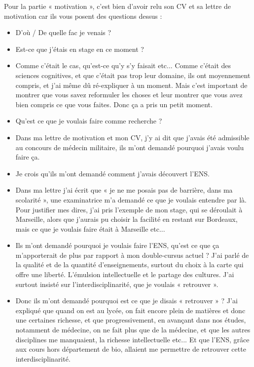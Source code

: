 Pour la partie « motivation », c’est bien d’avoir relu son CV et sa lettre de motivation car ils vous posent des questions dessus :

\begin{itemize}
    \item D’où / De quelle fac je venais ?
    \item Est-ce que j’étais en stage en ce moment ?
    \item Comme c’était le cas, qu’est-ce qu’y s'y faisait etc... Comme c’était des sciences cognitives, et que c’était pas trop leur domaine, ils ont moyennement compris, et j’ai même dû ré-expliquer à un moment. Mais c’est important de montrer que vous savez reformuler les choses et leur montrer que vous avez bien compris ce que vous faites. Donc ça a pris un petit moment.
    \item Qu’est ce que je voulais faire comme recherche ?
    \item Dans ma lettre de motivation et mon CV, j’y ai dit que j’avais été admissible au concours de médecin militaire, ils m’ont demandé pourquoi j’avais voulu faire ça.
    \item Je crois qu’ils m’ont demandé comment j’avais découvert l’ENS.
    \item Dans ma lettre j’ai écrit que « je ne me posais pas de barrière, dans ma scolarité », une examinatrice m’a demandé ce que je voulais entendre par là. Pour justifier mes dires, j’ai pris l’exemple de mon stage, qui se déroulait à Marseille, alors que j’aurais pu choisir la facilité en restant sur Bordeaux, mais ce que je voulais faire était à Marseille etc...
    \item Ils m’ont demandé pourquoi je voulais faire l’ENS, qu’est ce que ça m’apporterait de plus par rapport à mon double-cursus actuel ? J’ai parlé de la qualité et de la quantité d’enseignements, surtout du choix à la carte qui offre une liberté. L’émulsion intellectuelle et le partage des cultures. J’ai surtout insisté sur l’interdisciplinarité, que je voulais « retrouver ».
    \item Donc ils m’ont demandé pourquoi est ce que je disais « retrouver » ? J’ai expliqué que quand on est au lycée, on fait encore plein de matières et donc une certaines richesse, et que progressivement, en avançant dans nos études, notamment de médecine, on ne fait plus que de la médecine, et que les autres disciplines me manquaient, la richesse intellectuelle etc... Et que l’ENS, grâce aux cours hors département de bio, allaient me permettre de retrouver cette interdisciplinarité.

\end{itemize}
